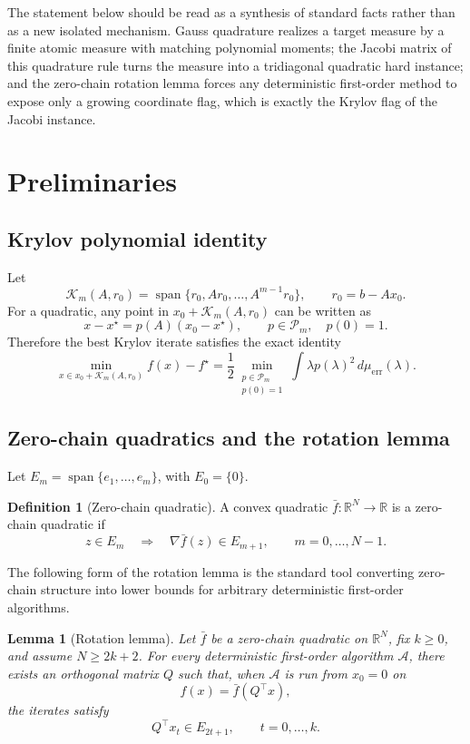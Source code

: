 \documentclass[11pt]{article}
\newtheorem{lemma}[theorem]{Lemma}
\theoremstyle{definition}
\newtheorem{definition}[theorem]{Definition}
\newcommand{\R}{\mathbb{R}}
\newcommand{\K}{\mathcal{K}}
\newcommand{\Pcal}{\mathcal{P}}
\begin{document}
The statement below should be read as a synthesis of standard facts rather
than as a new isolated mechanism.  Gauss quadrature realizes a target measure
by a finite atomic measure with matching polynomial moments; the Jacobi matrix
of this quadrature rule turns the measure into a tridiagonal quadratic hard
instance; and the zero-chain rotation lemma forces any deterministic
first-order method to expose only a growing coordinate flag, which is exactly
the Krylov flag of the Jacobi instance.

\section{Preliminaries}

\subsection{Krylov polynomial identity}

Let
\[
  \K_m(A,r_0)=\operatorname{span}\{r_0,Ar_0,\ldots,A^{m-1}r_0\},
  \qquad r_0=b-Ax_0.
\]
For a quadratic, any point in \(x_0+\K_m(A,r_0)\) can be written as
\[
  x-x^\star=p(A)(x_0-x^\star),
  \qquad p\in\Pcal_m,\quad p(0)=1.
\]
Therefore the best Krylov iterate satisfies the exact identity
\[
  \min_{x\in x_0+\K_m(A,r_0)} f(x)-f^\star
  =
  \frac12
  \min_{\substack{p\in\Pcal_m\\p(0)=1}}
  \int \lambda p(\lambda)^2\,d\mu_{\mathrm{err}}(\lambda).
  \tag{2}
\]

\subsection{Zero-chain quadratics and the rotation lemma}

Let \(E_m=\operatorname{span}\{e_1,\ldots,e_m\}\), with \(E_0=\{0\}\).

\begin{definition}[Zero-chain quadratic]
A convex quadratic \(\bar f:\R^N\to\R\) is a zero-chain quadratic if
\[
  z\in E_m \quad\Longrightarrow\quad \nabla \bar f(z)\in E_{m+1},
  \qquad m=0,\ldots,N-1.
\]
\end{definition}

The following form of the rotation lemma is the standard tool converting
zero-chain structure into lower bounds for arbitrary deterministic first-order
algorithms.

\begin{lemma}[Rotation lemma]
\label{lem:rotation}
Let \(\bar f\) be a zero-chain quadratic on \(\R^N\), fix \(k\ge 0\), and
assume \(N\ge 2k+2\).  For every deterministic first-order algorithm
\(\mathcal A\), there exists an orthogonal matrix \(Q\) such that, when
\(\mathcal A\) is run from \(x_0=0\) on
\[
  f(x)=\bar f(Q^\top x),
\]
the iterates satisfy
\[
  Q^\top x_t\in E_{2t+1},
  \qquad t=0,\ldots,k.
\]
\end{lemma}
\end{document}
